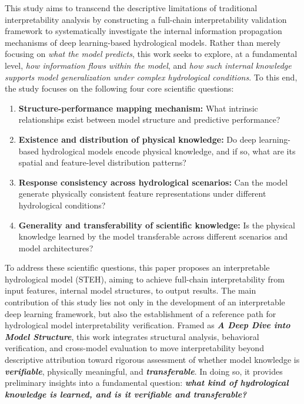 This study aims to transcend the descriptive limitations of traditional interpretability analysis by constructing a full-chain interpretability validation framework to systematically investigate the internal information propagation mechanisms of deep learning-based hydrological models. Rather than merely focusing on \textit{what the model predicts}, this work seeks to explore, at a fundamental level, \textit{how information flows within the model}, and \textit{how such internal knowledge supports model generalization under complex hydrological conditions}. To this end, the study focuses on the following four core scientific questions:

\begin{enumerate}

    \item \textbf{Structure-performance mapping mechanism:} What intrinsic relationships exist between model structure and predictive performance?

    \item \textbf{Existence and distribution of physical knowledge:} Do deep learning-based hydrological models encode physical knowledge, and if so, what are its spatial and feature-level distribution patterns?

    \item \textbf{Response consistency across hydrological scenarios:} Can the model generate physically consistent feature representations under different hydrological conditions?

    \item \textbf{Generality and transferability of scientific knowledge:} Is the physical knowledge learned by the model transferable across different scenarios and model architectures?

\end{enumerate}

To address these scientific questions, this paper proposes an interpretable hydrological model (STEH), aiming to achieve full-chain interpretability from input features, internal model structures, to output results. The main contribution of this study lies not only in the development of an interpretable deep learning framework, but also the establishment of a reference path for hydrological model interpretability verification. Framed as \textbf{\textit{A Deep Dive into Model Structure}}, this work integrates structural analysis, behavioral verification, and cross-model evaluation to move interpretability beyond descriptive attribution toward rigorous assessment of whether model knowledge is \textbf{\textit{verifiable}}, physically meaningful, and \textbf{\textit{transferable}}. In doing so, it provides preliminary insights into a fundamental question: \textbf{\emph{what kind of hydrological knowledge is learned, and is it verifiable and transferable?}}